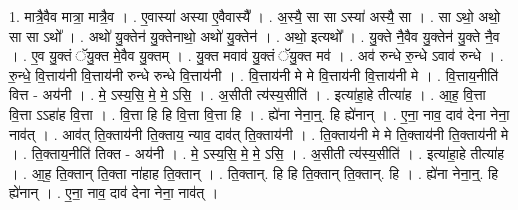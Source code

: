 \documentclass[17pt]{extarticle}
\begin{document}
1. मात्रै॒वैव मात्रा॒ मात्रै॒व । . ए॒वास्या॑ अस्या ए॒वैवास्यै᳚ । . अ॒स्यै॒ सा सा ऽस्या॑ अस्यै॒ सा । . सा ऽथो॒ अथो॒ सा सा ऽथो᳚ । . अथो॑ यु॒क्तेन॑ यु॒क्तेनाथो॒ अथो॑ यु॒क्तेन॑ । . अथो॒ इत्यथो᳚ । . यु॒क्ते नै॒वैव यु॒क्तेन॑ यु॒क्ते नै॒व । . ए॒व यु॒क्तं ॅयु॒क्त मे॒वैव यु॒क्तम् । . यु॒क्त मवाव॑ यु॒क्तं ॅयु॒क्त मव॑ । . अव॑ रुन्धे रु॒न्धे ऽवाव॑ रुन्धे । . रु॒न्धे॒ वि॒त्ताय॑नी वि॒त्ताय॑नी रुन्धे रुन्धे वि॒त्ताय॑नी । . वि॒त्ताय॑नी मे मे वि॒त्ताय॑नी वि॒त्ताय॑नी मे । . वि॒त्ताय॒नीति॑ वित्त - अय॑नी । . मे॒ ऽस्य॒सि॒ मे॒ मे॒ ऽसि॒ । . अ॒सीती त्य॑स्य॒सीति॑ । . इत्या॑हा॒हे तीत्या॑ह । . आ॒ह॒ वि॒त्ता वि॒त्ता ऽऽहा॑ह वि॒त्ता । . वि॒त्ता हि हि वि॒त्ता वि॒त्ता हि । . ह्ये॑ना नेना॒न्॒. हि ह्ये॑नान् । . ए॒ना॒ नाव॒ दाव॑ देना नेना॒ नाव॑त् । . आव॑त् ति॒क्ताय॑नी ति॒क्ताय॒ न्याव॒ दाव॑त् ति॒क्ताय॑नी । . ति॒क्ताय॑नी मे मे ति॒क्ताय॑नी ति॒क्ताय॑नी मे । . ति॒क्ताय॒नीति॑ तिक्त - अय॑नी । . मे॒ ऽस्य॒सि॒ मे॒ मे॒ ऽसि॒ । . अ॒सीती त्य॑स्य॒सीति॑ । . इत्या॑हा॒हे तीत्या॑ह । . आ॒ह॒ ति॒क्तान् ति॒क्ता ना॑हाह ति॒क्तान् । . ति॒क्तान्. हि हि ति॒क्तान् ति॒क्तान्. हि । . ह्ये॑ना नेना॒न्॒. हि ह्ये॑नान् । . ए॒ना॒ नाव॒ दाव॑ देना नेना॒ नाव॑त् । \newline
\end{document}
